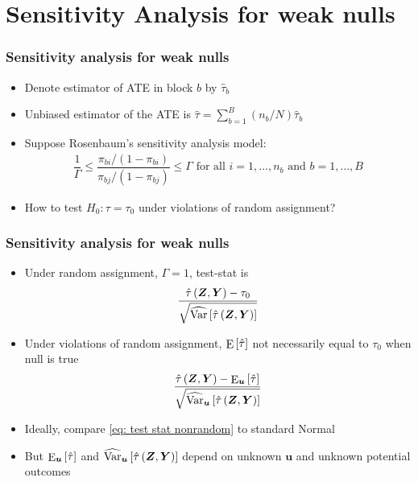 \documentclass[table, xcolor = {dvipsnames}, 9pt]{beamer}
\theoremstyle{plain}
\DeclareMathOperator{\E}{\rm{E}}
\DeclareMathOperator{\Var}{\rm{Var}}
\begin{document}
\section{Sensitivity Analysis for weak nulls}
\begin{frame}
\frametitle{Sensitivity analysis for weak nulls} 
\vfill
\begin{itemize} \vfill
\item Denote estimator of ATE in block $b$ by $\hat{\tau}_b$ \vfill
\item Unbiased estimator of the ATE is $\hat{\tau} = \sum \limits_{b = 1}^B (n_b/N)\hat{\tau}_b$ \vfill
\item Suppose Rosenbaum's sensitivity analysis model: \vfill
\begin{align*}
\dfrac{1}{\Gamma} \leq \dfrac{\pi_{bi}/(1 - \pi_{bi})}{\pi_{bj} / (1 - \pi_{bj})} \leq \Gamma \text{ for all } i = 1, \ldots , n_b \text{ and } b = 1, \ldots , B 
\end{align*} \vfill
\item How to test $H_0: \tau = \tau_0$ under violations of random assignment? \vfill
\end{itemize}  
\vfill
\end{frame}
\begin{frame}[t]
\frametitle{Sensitivity analysis for weak nulls} 
\vfill
\begin{itemize} \vfill
\item Under random assignment, $\Gamma = 1$, test-stat is \vfill
\begin{align*}
\frac{\hat{\tau}\left(\bm{Z}, \bm{Y}\right) - \tau_0}{\sqrt{\widehat{\Var}\left[\hat{\tau}\left(\bm{Z}, \bm{Y}\right)\right]}}
\end{align*} \vfill
\item Under violations of random assignment, $\E\left[\hat{\tau}\right]$ not necessarily equal to $\tau_0$ when null is true \vfill
\begin{align} \label{eq: test stat nonrandom}
\frac{\hat{\tau}\left(\bm{Z}, \bm{Y}\right) - \E_{\bm{u}}\left[\hat{\tau}\right]}{\sqrt{\widehat{\Var}_{\bm{u}}\left[\hat{\tau}\left(\bm{Z}, \bm{Y}\right)\right]}}
\end{align} \vfill
\item Ideally, compare \eqref{eq: test stat nonrandom} to standard Normal \vfill
\item But $\E_{\bm{u}}\left[\hat{\tau}\right]$ and $\widehat{\Var}_{\bm{u}}\left[\hat{\tau}\left(\bm{Z}, \bm{Y}\right)\right]$ depend on unknown $\bm{u}$ and unknown potential outcomes
\end{itemize}  
\vfill
\end{frame}
\end{document}
